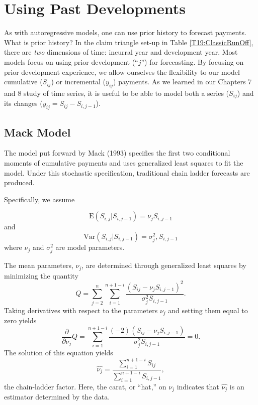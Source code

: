 \linejed


\section{Using Past Developments}

As with autoregressive models, one can use prior history to forecast
payments. What is prior history? In the claim triangle set-up in
Table \ref{T19:ClassicRunOff}, there are \emph{two} dimensions of
time: incurral year and development year. Most models focus on using
prior development (``$j$'') for forecasting. By focusing on prior
development experience, we allow ourselves the flexibility to our
model cumulative ($S_{ij}$) or incremental ($y_{ij}$) payments. As
we learned in our Chapters 7 and 8 study of time series, it is
useful to be able to model both a series ($S_{ij}$) and its changes
($y_{ij} = S_{ij}-S_{i,j-1}$).


\subsection{Mack Model}

The model put forward by Mack (1993) specifies the first two
conditional moments of cumulative payments and uses generalized
least squares to fit the model. Under this stochastic specification,
traditional chain ladder forecasts are produced.

Specifically, we assume

\begin{equation}\label{E19:MackMoment1}
\mathrm{E} \left( S_{i,j} | S_{i,j-1} \right) = \nu_j  S_{i,j-1}
\end{equation}
and
\begin{equation}\label{E19:MackMoment2}
\mathrm{Var} \left( S_{i,j} | S_{i,j-1} \right) = \sigma^2_j ,
S_{i,j-1}
\end{equation}
where $\nu_j$ and $\sigma^2_j$ are model parameters.

The mean parameters, $\nu_j$, are determined through generalized
least squares by minimizing the quantity
\begin{equation*}
Q = \sum_{j=2}^n \sum_{i=1}^{n+1-i}
 \frac{(S_{ij} - \nu_j S_{i,j-1})^2}{\sigma_j^2 S_{i,j-1}} .
 \end{equation*}
Taking derivatives with respect to the parameters $\nu_j$ and
setting them equal to zero yields
\begin{equation*}
\frac{\partial}{\partial \nu_j}Q = \sum_{i=1}^{n+1-i}
     \frac{(-2) (S_{ij} - \nu_j S_{i,j-1})}{\sigma_j^2 S_{i,j-1}} =0.
\end{equation*}
The solution of this equation yields
\begin{equation*}
\hat{\nu_j}= \frac{\sum_{i=1}^{n+1-i} S_{ij}} {\sum_{i=1}^{n+1-i}
S_{i,j-1}},
 \end{equation*}
the chain-ladder factor. Here, the carat, or ``hat,'' on $\nu_j$
indicates that $\hat{\nu_j}$ is an estimator determined by the data.

